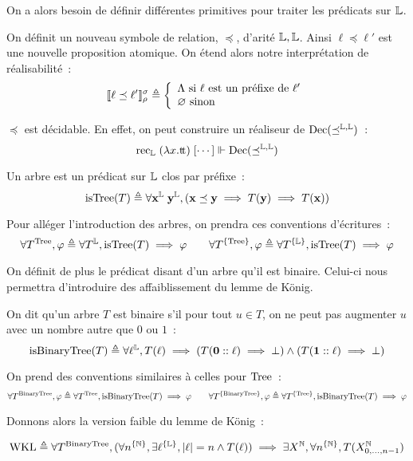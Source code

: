 \documentclass{article}
\begin{document}
On a alors besoin de définir différentes primitives pour traiter les prédicats sur $\mathbb{L}$.

\begin{defi}[Préfixe]
  On définit un nouveau symbole de relation, $\preceq$, d'arité $\mathbb{L},\mathbb{L}$. Ainsi $\ell \preceq \ell'$ est une nouvelle proposition atomique. On étend alors notre interprétation de réalisabilité~:
  \[\llbracket \ell \preceq \ell' \rrbracket_\rho^\sigma \triangleq
  \left\{\begin{array}{l}
  \Lambda\text{ si } \ell \text{ est un préfixe de } \ell'\\
  \varnothing\text{ sinon}
  \end{array}\right.\]
\end{defi}

\begin{lem}
  $\preceq$ est décidable. En effet, on peut construire un réaliseur de $\mathrm{Dec}(\preceq^{\mathbb{L},\mathbb{L}})$~:
  \[\mathrm{rec}_{\mathbb{L}}\;(\lambda x.\mathrm{t}\!\mathrm{t})\;[\cdots]\Vdash \mathrm{Dec}(\preceq^{\mathbb{L},\mathbb{L}})\]
\end{lem}

\begin{defi}[Arbre]
  Un arbre est un prédicat sur $\mathbb{L}$ clos par préfixe~:
  \[\mathrm{isTree}(T) \triangleq \forall \mathbf{x}^{\mathbb{L}}\;\mathbf{y}^{\mathbb{L}}, (\mathbf{x}\preceq \mathbf{y} \implies T(\mathbf{y}) \implies T(\mathbf{x}))\]
\end{defi}

\begin{nota}
  Pour alléger l'introduction des arbres, on prendra ces conventions d'écritures~:
  \[\forall T^{\mathrm{Tree}}, \varphi \triangleq \forall T^{\mathbb{L}}, \mathrm{isTree}(T) \implies \varphi\qquad \forall T^{\{\mathrm{Tree}\}}, \varphi\triangleq \forall T^{\{\mathbb{L}\}}, \mathrm{isTree}(T) \implies \varphi\]
\end{nota}

On définit de plus le prédicat disant d'un arbre qu'il est binaire. Celui-ci nous permettra d'introduire des affaiblissement du lemme de König.

\begin{defi}
  On dit qu'un arbre $T$ est binaire s'il pour tout $u\in T$, on ne peut pas augmenter $u$ avec un nombre autre que $0$ ou $1$~:
  \[\mathrm{isBinaryTree}(T) \triangleq \forall \ell^{\mathbb{L}}, T(\ell) \implies (T(\boldsymbol 0 :: \ell) \implies \bot) \land (T(\boldsymbol 1 :: \ell) \implies \bot)\]
\end{defi}

\begin{nota}
  On prend des conventions similaires à celles pour $\mathrm{Tree}$~:
  \[\forall T^{\mathrm{BinaryTree}}, \varphi \triangleq \forall T^{\mathrm{Tree}}, \mathrm{isBinaryTree}(T) \implies \varphi \qquad \forall T^{\{\mathrm{BinaryTree}\}}, \varphi \triangleq \forall T^{\{\mathrm{Tree}\}}, \mathrm{isBinaryTree}(T) \implies \varphi\]
\end{nota}

Donnons alors la version faible du lemme de König~:

\[\mathrm{WKL} \triangleq \forall T^{\mathrm{BinaryTree}}, (\forall n^{\{\mathbb{N}\}}, \exists \ell^{\{\mathbb{L}\}}, |\ell| = n \land T(\ell)) \implies \exists X^{\mathbb{N}}, \forall n^{\{\mathbb{N}\}}, T(X^{\mathbb{N}}_{0,\ldots,n-1})\]
\end{document}
